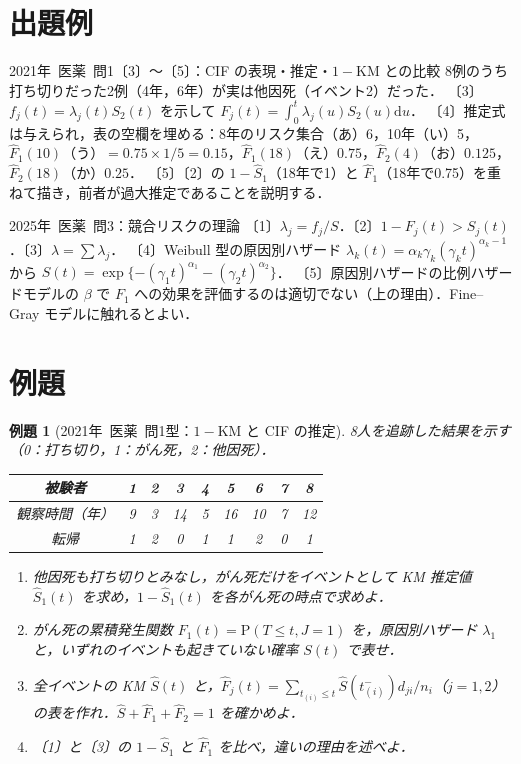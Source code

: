 \documentclass[a4paper,11pt,openany]{ltjsbook}
\newtheorem{reidai}{例題}[chapter]
\newcommand{\kakomon}[2]{\mbox{#1年 医薬 問#2}}
\newcommand{\Prob}{\mathrm{P}}
\newcommand{\dd}{\mathrm{d}}
\begin{document}
\section{出題例}\label{sec:m05-shutsudai}
\begin{shutsudai}{\kakomon{2021}{1}〔3〕〜〔5〕：CIF の表現・推定・$1-\mathrm{KM}$ との比較}
8例のうち打ち切りだった2例（4年，6年）が実は他因死（イベント2）だった．
〔3〕$f_j(t)=\lambda_j(t)S_2(t)$ を示して $F_j(t)=\int_0^t\lambda_j(u)S_2(u)\dd u$．
〔4〕推定式は与えられ，表の空欄を埋める：8年のリスク集合（あ）6，10年（い）5，$\hat F_1(10)$（う）$=0.75\times1/5=0.15$，$\hat F_1(18)$（え）$0.75$，$\hat F_2(4)$（お）$0.125$，$\hat F_2(18)$（か）$0.25$．
〔5〕〔2〕の $1-\hat S_1$（18年で1）と $\hat F_1$（18年で0.75）を重ねて描き，前者が過大推定であることを説明する．
\end{shutsudai}
\begin{shutsudai}{\kakomon{2025}{3}：競合リスクの理論}
〔1〕$\lambda_j=f_j/S$．〔2〕$1-F_j(t)>S_j(t)$．〔3〕$\lambda=\sum\lambda_j$．
〔4〕Weibull 型の原因別ハザード $\lambda_k(t)=\alpha_k\gamma_k(\gamma_kt)^{\alpha_k-1}$ から $S(t)=\exp\{-(\gamma_1t)^{\alpha_1}-(\gamma_2t)^{\alpha_2}\}$．
〔5〕原因別ハザードの比例ハザードモデルの $\beta$ で $F_1$ への効果を評価するのは適切でない（上の理由）．Fine--Gray モデルに触れるとよい．
\end{shutsudai}

\section{例題}\label{sec:m05-reidai}
\begin{reidai}[\kakomon{2021}{1}型：$1-\mathrm{KM}$ と CIF の推定]\label{reidai:m05-1}
8人を追跡した結果を示す（0：打ち切り，1：がん死，2：他因死）．
\begin{center}\small
\begin{tabular}{@{}ccccccccc@{}}
\toprule
被験者 & 1 & 2 & 3 & 4 & 5 & 6 & 7 & 8\\
\midrule
観察時間（年） & 9 & 3 & 14 & 5 & 16 & 10 & 7 & 12\\
転帰 & 1 & 2 & 0 & 1 & 1 & 2 & 0 & 1\\
\bottomrule
\end{tabular}
\end{center}
\begin{enumerate}[label=〔\arabic*〕]
\item 他因死も打ち切りとみなし，がん死だけをイベントとして KM 推定値 $\hat S_1(t)$ を求め，$1-\hat S_1(t)$ を各がん死の時点で求めよ．
\item がん死の累積発生関数 $F_1(t)=\Prob(T\le t,J=1)$ を，原因別ハザード $\lambda_1$ と，いずれのイベントも起きていない確率 $S(t)$ で表せ．
\item 全イベントの KM $\hat S(t)$ と，$\hat F_j(t)=\sum_{t_{(i)}\le t}\hat S(t_{(i)}^-)d_{ji}/n_i$（$j=1,2$）の表を作れ．$\hat S+\hat F_1+\hat F_2=1$ を確かめよ．
\item 〔1〕と〔3〕の $1-\hat S_1$ と $\hat F_1$ を比べ，違いの理由を述べよ．
\end{enumerate}
\end{reidai}
\end{document}
